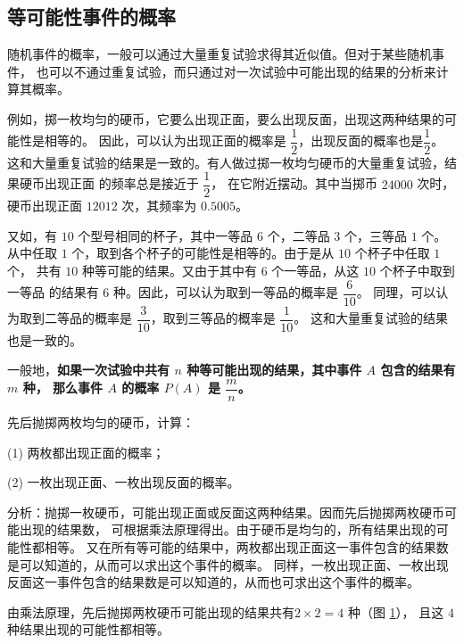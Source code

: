 \subsection{等可能性事件的概率}\label{subsec:3-2}

随机事件的概率，一般可以通过大量重复试验求得其近似值。但对于某些随机事件，
也可以不通过重复试验，而只通过对一次试验中可能出现的结果的分析来计算其概率。


例如，掷一枚均匀的硬币，它要么出现正面，要么出现反面，出现这两种结果的可能性是相等的。
因此，可以认为出现正面的概率是 $\dfrac{1}{2}$，出现反面的概率也是$\dfrac{1}{2}$。
这和大量重复试验的结果是一致的。有人做过掷一枚均匀硬币的大量重复试验，结果硬币出现正面
的频率总是接近于 $\dfrac{1}{2}$， 在它附近摆动。其中当掷币 $24000$ 次时，
硬币出现正面 $12012$ 次，其频率为 $0.5005$。


又如，有 $10$ 个型号相同的杯子，其中一等品 $6$ 个，二等品 $3$ 个，三等品 $1$ 个。
从中任取 $1$ 个，取到各个杯子的可能性是相等的。由于是从 $10$ 个杯子中任取 $1$ 个，
共有 $10$ 种等可能的结果。又由于其中有 $6$ 个一等品，从这 $10$ 个杯子中取到一等品
的结果有 $6$ 种。因此，可以认为取到一等品的概率是 $\dfrac{6}{10}$。
同理，可以认为取到二等品的概率是 $\dfrac{3}{10}$，取到三等品的概率是 $\dfrac{1}{10}$。
这和大量重复试验的结果也是一致的。

一般地，\textbf{如果一次试验中共有 $n$ 种等可能出现的结果，其中事件 $A$ 包含的结果有 $m$ 种，
那么事件 $A$ 的概率 $P(A)$ 是 $\dfrac{m}{n}$。}



\liti 先后抛掷两枚均匀的硬币，计算：

(1) 两枚都出现正面的概率；

(2) 一枚出现正面、一枚出现反面的概率。

分析：抛掷一枚硬币，可能出现正面或反面这两种结果。因而先后抛掷两枚硬币可能出现的结果数，
可根据乘法原理得出。由于硬币是均匀的，所有结果出现的可能性都相等。
又在所有等可能的结果中，两枚都出现正面这一事件包含的结果数是可以知道的，从而可以求出这个事件的概率。
同样，一枚出现正面、一枚出现反面这一事件包含的结果数是可以知道的，从而也可求出这个事件的概率。

\jie 由乘法原理，先后抛掷两枚硬币可能出现的结果共有$2 \times 2 = 4$ 种（图 \ref{fig:3-1}），
且这 $4$ 种结果出现的可能性都相等。

\begin{figure}[htbp]
    \centering
    
    \caption{}\label{fig:3-1}
\end{figure}


